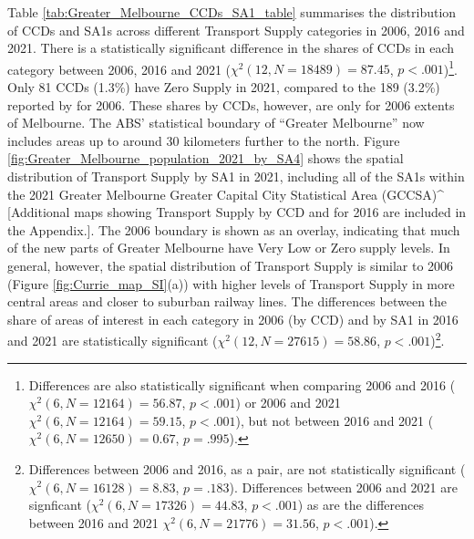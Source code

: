 \documentclass[preprint, 3p,
authoryear]{elsarticle} %
\begin{document}
Table \ref{tab:Greater_Melbourne_CCDs_SA1_table} summarises the
distribution of CCDs and SA1s across different Transport Supply
categories in 2006, 2016 and 2021. There is a statistically significant
difference in the shares of CCDs in each category between 2006, 2016 and
2021 (\(\chi^2(12, N = 18489) = 87.45\), \(p < .001\))\footnote{Differences
  are also statistically significant when comparing 2006 and 2016
  (\(\chi^2(6, N = 12164) = 56.87\), \(p < .001\)) or 2006 and 2021
  \(\chi^2(6, N = 12164) = 59.15\), \(p < .001\)), but not between 2016
  and 2021 (\(\chi^2(6, N = 12650) = 0.67\), \(p = .995\)).}. Only 81
CCDs (1.3\%) have Zero Supply in 2021, compared to the 189 (3.2\%)
reported by \citet{currie2010identifying} for 2006. These shares by
CCDs, however, are only for 2006 extents of Melbourne. The ABS'
statistical boundary of ``Greater Melbourne'' now includes areas up to
around 30 kilometers further to the north. Figure
\ref{fig:Greater_Melbourne_population_2021_by_SA4} shows the spatial
distribution of Transport Supply by SA1 in 2021, including all of the
SA1s within the 2021 Greater Melbourne Greater Capital City Statistical
Area (GCCSA)\^{} {[}Additional maps showing Transport Supply by CCD and
for 2016 are included in the Appendix.{]}. The 2006 boundary is shown as
an overlay, indicating that much of the new parts of Greater Melbourne
have Very Low or Zero supply levels. In general, however, the spatial
distribution of Transport Supply is similar to 2006 (Figure
\ref{fig:Currie_map_SI}(a)) with higher levels of Transport Supply in
more central areas and closer to suburban railway lines. The differences
between the share of areas of interest in each category in 2006 (by CCD)
and by SA1 in 2016 and 2021 are statistically significant
(\(\chi^2(12, N = 27615) = 58.86\), \(p < .001\))\footnote{Differences
  between 2006 and 2016, as a pair, are not statistically significant
  (\(\chi^2(6, N = 16128) = 8.83\), \(p = .183\)). Differences between
  2006 and 2021 are signficant (\(\chi^2(6, N = 17326) = 44.83\),
  \(p < .001\)) as are the differences between 2016 and 2021
  \(\chi^2(6, N = 21776) = 31.56\), \(p < .001\)).}.
\end{document}
